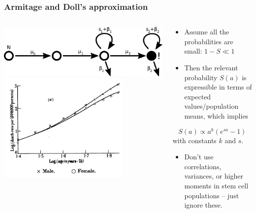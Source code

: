 \documentclass{beamer}
\begin{document}
\begin{frame}
\end{frame}


\begin{frame}
    \frametitle{Armitage and Doll's approximation}

    \begin{columns}
        \begin{column}{0.5\textwidth}
            \includegraphics[width=1.00\textwidth]{figures/diagram3}
            \includegraphics[width=0.75\textwidth]{figures/ArmitageDoll1957_4A.png}
        \end{column}
        \begin{column}{0.5\textwidth}
        \begin{itemize}
            \item Assume all the probabilities are small: $1-S \ll 1$
            \item Then the relevant probability $S(a)$ is expressible in terms
            of expected values/population means, which implies
        \end{itemize}
        \begin{equation}
            S(a) \propto a^k (e^{s a} - 1)
        \end{equation}
        with constants $k$ and $s$.
        \begin{itemize}
            \item Don't use correlations, variances, or higher moments in stem
            cell populations -- just ignore these.
        \end{itemize}
        \end{column}
    \end{columns}
\end{frame}
\end{document}
